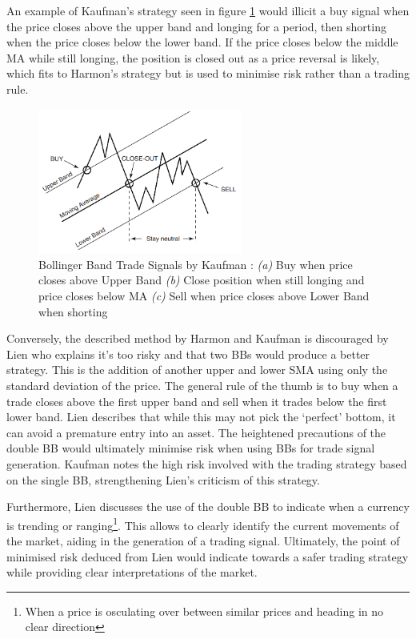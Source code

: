 An example of Kaufman's strategy seen in figure \ref{fig:related:BB_trade_strat} would illicit a buy signal when the price closes above the upper band and longing for a period, then shorting when the price closes below the lower band. If the price closes below the middle MA while still longing, the position is closed out as a price reversal is likely, which fits to Harmon's \cite{BOOK:Harmon:2014} strategy but is used to minimise risk rather than a trading rule.

\begin{figure}[htb]
    \centering
	\includegraphics[width=0.6\textwidth]{content/graphics/BB_Trade_Strat}
	\caption{Bollinger Band Trade Signals by Kaufman \cite{BOOK:Kaufman:2013}: 
	\textit{(a)} Buy when price closes above Upper Band
	\textit{(b)} Close position when still longing and price closes below MA
    \textit{(c)} Sell when price closes above Lower Band when shorting}
	\label{fig:related:BB_trade_strat}
\end{figure}

Conversely, the described method by Harmon \cite{BOOK:Harmon:2014} and Kaufman \cite{BOOK:Kaufman:2013} is discouraged by Lien \cite{BOOK:Lien:2016} who explains it's too risky and that two BBs would produce a better strategy. This is the addition of another upper and lower SMA using only the standard deviation of the price. The general rule of the thumb is to buy when a trade closes above the first upper band and sell when it trades below the first lower band. Lien describes that while this may not pick the `perfect' bottom, it can avoid a premature entry into an asset. The heightened precautions of the double BB would ultimately minimise risk when using BBs for trade signal generation. Kaufman \cite{BOOK:Kaufman:2013} notes the high risk involved with the trading strategy based on the single BB, strengthening Lien's criticism of this strategy.

Furthermore, Lien \cite{BOOK:Lien:2016} discusses the use of the double BB to indicate when a currency is trending or ranging\footnote{When a price is osculating over between similar prices and heading in no clear direction}. This allows to clearly identify the current movements of the market, aiding in the generation of a trading signal. Ultimately, the point of minimised risk deduced from Lien would indicate towards a safer trading strategy while providing clear interpretations of the market. 

